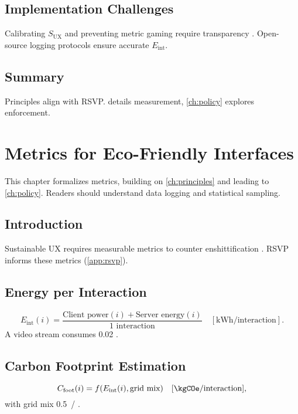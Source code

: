 \documentclass[openany]{book}
\newcommand{\Eint}{E_{\mathrm{int}}} %
\newcommand{\Cfoot}{C_{\mathrm{foot}}} %
\newcommand{\SUX}{S_{\mathrm{UX}}} %
\newcommand{\kWh}{\mathrm{kWh}}
\begin{document}
\section{Implementation Challenges}
\label{sec:principles-challenges}
Calibrating \(\SUX\) and preventing metric gaming require transparency \citep{colak2024}. Open-source logging protocols ensure accurate \(\Eint\).

\section{Summary}
Principles align with RSVP.  details measurement, \cref{ch:policy} explores enforcement.

\chapter{Metrics for Eco-Friendly Interfaces}
\label{ch:metrics}

This chapter formalizes metrics, building on \cref{ch:principles} and leading to \cref{ch:policy}. Readers should understand data logging and statistical sampling.

\section{Introduction}
\label{sec:metrics-intro}
Sustainable UX requires measurable metrics to counter enshittification \citep{prigogine1984,doctorow2022}. RSVP informs these metrics (\cref{app:rsvp}).

\section{Energy per Interaction}
\label{sec:metrics-energy}
\begin{equation}
\label{eq:Eint}
\Eint(i) = \frac{\text{Client power}(i) + \text{Server energy}(i)}{\text{1 interaction}} \quad [\kWh/\text{interaction}].
\end{equation}
A video stream consumes \SI{0.02}{\kWh} \citep{extentia2024}.

\section{Carbon Footprint Estimation}
\label{sec:metrics-carbon}
\begin{equation}
\label{eq:Cfoot}
\Cfoot(i) = f(\Eint(i), \text{grid mix}) \quad [\kgCOe/\text{interaction}],
\end{equation}
with grid mix \SI{0.5}{\kgCOe/\kWh} \citep{colak2024}.
\end{document}
